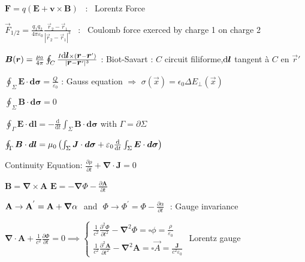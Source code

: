 \begin{squishlist}
\item $ \boldsymbol{F} = q(\boldsymbol{E}+\boldsymbol{v} \times \boldsymbol{B}) $ \, :  \, Lorentz Force

\item $ \vec{F}_{1/2} = \frac{q_1q_2}{4\pi\varepsilon_0} \frac{\vec{r}_2 - \vec{r}_1}{|\vec{r}_2 - \vec{r}_1|^3} $ \, : \, Coulomb force exerced by charge 1 on charge 2
\item $\vec{B}(\vec{r}) = \frac{\mu_0}{4\pi} \oint_{C} \frac{I \vec{\ud l} \times (\vec{r} - \vec{r}')}{|\vec{r}-\vec{r}'|^3} $  :  Biot-Savart : $C$ circuit filiforme,$\vec{\ud l}$ tangent à $C$ en  $\vec{r}'$

\item $ \oint_{\Sigma}\boldsymbol{E} \cdot \boldsymbol{d\sigma} = \frac{Q}{\varepsilon_0}$ : Gauss equation
$\Longrightarrow$ \squishsep $\sigma(\vec{x}) = \epsilon_0 \Delta E_{\perp}(\vec{x})$

\item $ \oint_{\Sigma}\boldsymbol{B} \cdot \boldsymbol{d\sigma} = 0$

\item $ \oint_{\Gamma} \boldsymbol{E} \cdot \boldsymbol{dl} = -\frac{\text{d}}{\text{d}t}\int_{\Sigma} \boldsymbol{B} \cdot \boldsymbol{d\sigma}$ with $\Gamma=\partial\Sigma$

\item $ \oint_{\Gamma} \boldsymbol{B} \cdot \boldsymbol{dl} = \mu_0 \left(\int_{\Sigma} \boldsymbol{J} \cdot \boldsymbol{d\sigma} + \varepsilon_0 \frac{\ud }{\ud t}\int_{\Sigma} \boldsymbol{E} \cdot \boldsymbol{d\sigma}\right)$ 

\item Continuity Equation: $\frac{\partial \rho}{\partial t} + \boldsymbol{\nabla}\cdot\boldsymbol{J} = 0$
\end{squishlist}
\columnbreak


\begin{squishlist}
\item $\boldsymbol{B} = \boldsymbol{\nabla} \times \boldsymbol{A}$ \squishsep $\boldsymbol{E} = -\boldsymbol{\nabla} \Phi - \frac{\partial \boldsymbol{A}}{\partial t}$

\item $\vec{\rm{A}} \rightarrow \vec{\rm{A}}^{'} = \vec{\rm{A}} + \vec{\nabla}\alpha \,\,$  and  $\,\, \Phi \rightarrow \Phi^{'} = \Phi - \frac{\partial\alpha}{\partial t} \,\,$ : Gauge invariance 

\item $\boldsymbol{\nabla} \cdot \boldsymbol{A} + \frac{1}{c^2}\frac{\partial \Phi}{\partial t}=0\implies
\begin{cases}
	\frac{1}{c^2}\frac{\partial^2 \Phi }{\partial t^2} - \boldsymbol{\nabla}^2 \Phi = \square \phi = \frac{\rho}{\varepsilon_0} \\
	\frac{1}{c^2}\frac{\partial^2 \boldsymbol{A}}{\partial t^2} - \boldsymbol{\nabla}^2 \boldsymbol{A} = \square \vec{A} =  \frac{\boldsymbol{J}}{c^2\varepsilon_0}
\end{cases}$ Lorentz gauge
\end{squishlist}

